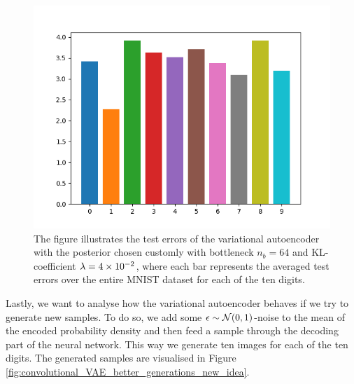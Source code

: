 \begin{figure}
\begin{center}
      \includegraphics[width=0.55\linewidth]{convolutional_VAE_new_idea_KL_4e-2_10k_epochs_64D_errors}
\end{center}
\caption{The figure illustrates the test errors of the variational autoencoder with the posterior chosen customly with bottleneck $n_b=64$ and KL-coefficient $\lambda = \num{4e-2}$, where each bar represents the averaged test errors over the entire MNIST dataset for each of the ten digits.}\label{fig:convolutional_VAE_new_idea_KL_4e-2_10k_epochs_64D_errors}
\end{figure}

Lastly, we want to analyse how the variational autoencoder behaves if we try to generate new samples. To do so, we add some $\operatorname{\epsilon}\sim \mathcal{N}(0,1)$-noise to the mean of the encoded probability density and then feed a sample through the decoding part of the neural network. This way we generate ten images for each of the ten digits. The generated samples are visualised in Figure \ref{fig:convolutional_VAE_better_generations_new_idea}.



